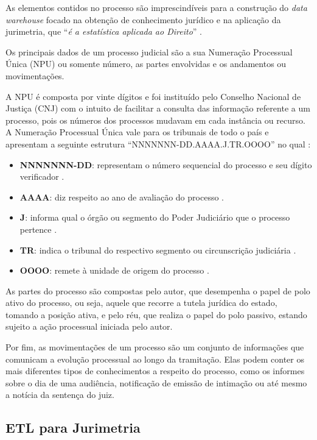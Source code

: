 As elementos contidos no processo são imprescindíveis para a construção do \textit{data warehouse} focado na obtenção de conhecimento jurídico e na aplicação da jurimetria, que \enquote{\textit{é a estatística aplicada ao Direito}} \cite{newlawJurimetria}.

Os principais dados de um processo judicial são a sua Numeração Processual Única (NPU) ou somente número, as partes envolvidas e os andamentos ou movimentações.

A NPU é composta por vinte dígitos e foi instituído pelo Conselho Nacional de Justiça (CNJ) com o intuito de facilitar a consulta das informação referente a um processo, pois os números dos processos mudavam em cada instância ou recurso. A Numeração Processual Única vale para os tribunais de todo o país e apresentam a seguinte estrutura \enquote{NNNNNNN-DD.AAAA.J.TR.OOOO} no qual \cite{jusbrasilNPU}:

\begin{itemize}
    \item \textbf{NNNNNNN-DD}: representam o número sequencial do processo e seu dígito verificador \cite{TRF4NPU}.
    \item \textbf{AAAA}: diz respeito ao ano de avaliação do processo \cite{TRF4NPU}.
    \item \textbf{J}: informa qual o órgão ou segmento do Poder Judiciário que o processo pertence \cite{TRF4NPU}.
    \item \textbf{TR}: indica o tribunal do respectivo segmento ou circunscrição judiciária \cite{TRF4NPU}.
    \item \textbf{OOOO}: remete à unidade de origem do processo \cite{TRF4NPU}.
\end{itemize}

As partes do processo são compostas pelo autor, que desempenha o papel de polo ativo do processo, ou seja, aquele que recorre a tutela jurídica do estado, tomando a posição ativa, e pelo réu, que realiza o papel do polo passivo, estando sujeito a ação processual iniciada pelo autor.

Por fim, as movimentações de um processo são um conjunto de informações que comunicam a evolução processual ao longo da tramitação. Elas podem conter os mais diferentes tipos de conhecimentos a respeito do processo, como os informes sobre o dia de uma audiência, notificação de emissão de intimação ou até mesmo a notícia da sentença do juiz.

\subsection{ETL para Jurimetria}
\label{jurimetria}

